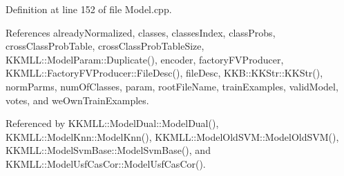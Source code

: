 Definition at line 152 of file Model.\+cpp.



References already\+Normalized, classes, classes\+Index, class\+Probs, cross\+Class\+Prob\+Table, cross\+Class\+Prob\+Table\+Size, K\+K\+M\+L\+L\+::\+Model\+Param\+::\+Duplicate(), encoder, factory\+F\+V\+Producer, K\+K\+M\+L\+L\+::\+Factory\+F\+V\+Producer\+::\+File\+Desc(), file\+Desc, K\+K\+B\+::\+K\+K\+Str\+::\+K\+K\+Str(), norm\+Parms, num\+Of\+Classes, param, root\+File\+Name, train\+Examples, valid\+Model, votes, and we\+Own\+Train\+Examples.



Referenced by K\+K\+M\+L\+L\+::\+Model\+Dual\+::\+Model\+Dual(), K\+K\+M\+L\+L\+::\+Model\+Knn\+::\+Model\+Knn(), K\+K\+M\+L\+L\+::\+Model\+Old\+S\+V\+M\+::\+Model\+Old\+S\+V\+M(), K\+K\+M\+L\+L\+::\+Model\+Svm\+Base\+::\+Model\+Svm\+Base(), and K\+K\+M\+L\+L\+::\+Model\+Usf\+Cas\+Cor\+::\+Model\+Usf\+Cas\+Cor().


